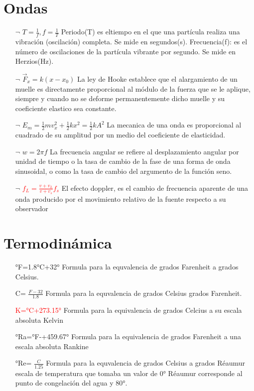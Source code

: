 \documentclass[a4paper, 12pt]{article}
\begin{document}
\section{Ondas}
\begin{enumerate}
    \item [$\neg$] {$T=\frac{1}{f}, f=\frac{1}{T}$} Periodo(T) es eltiempo en el que una partícula realiza una vibración (oscilación) completa. Se mide en segundos(s). Frecuencia(f): es el número de oscilaciones de la partícula vibrante por segundo. Se mide en Herzios(Hz).
    \item [$\neg$] {$\vec{F}_{x}=k(x-x_{0})$} La ley de Hooke establece que el alargamiento de un muelle es directamente proporcional al módulo de la fuerza que se le aplique, siempre y cuando no se deforme permanentemente dicho muelle y su coeficiente elastico sea constante.
    \item [$\neg$] {$E_{m}=\frac{1}{2}mv_{x}^{2}+\frac{1}{2}kx^{2}=\frac{1}{2}kA^{2}$} La mecanica de una onda es proporcional al cuadrado de su amplitud por un medio del coeficiente de elasticidad.
    \item [$\neg$] {$w=2\pi f$} La frecuencia angular se refiere al desplazamiento angular por unidad de tiempo o la tasa de cambio de la fase de una forma de onda sinusoidal, o como la tasa de cambio del argumento de la función seno.
    \item [$\neg$] \textcolor{red}{{$f_{L}=\frac{v+v_{L}}{v+v_{s}}f_{s}$}} El efecto doppler, es el cambio de frecuencia aparente de una onda producido por el movimiento relativo de la fuente respecto a su observador

    
\end{enumerate}

\section{Termodinámica}
\begin{enumerate}
    \item [\propto] {°F=1.8°C+32°} Formula para la equvalencia de grados Farenheit a grados Celsius.
    
    \item [\propto] {C= $\frac{F-32}{1.8}$} Formula para la equvalencia de grados Celsius grados Farenheit.

    \item[\propto] \textcolor{red}{{K=°C+273.15°}} Formula para la equivalencia de grados Celcius a su escala absoluta Kelvin

    \item[\propto] {°Ra=°F-+459.67°}  Formula para la equivalencia de grados Farenheit a una escala absoluta Rankine

    \item[\propto]{°Re= $\frac{C}{1.25}$}  Formula para la equvalencia de grados Celsius a grados Réaumur escala de temperatura que tomaba un valor de 0° Réaumur corresponde al punto de congelación del agua y 80°.
    
    \end{enumerate}
\end{document}
